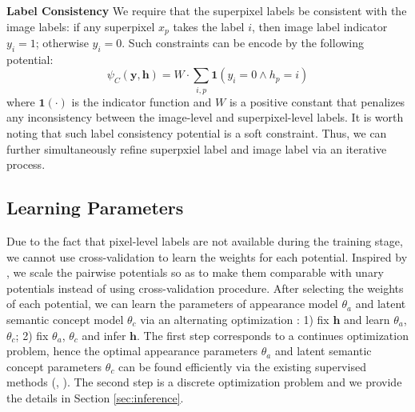 \textbf{Label Consistency}
We require that the superpixel labels be consistent with the image labels: if any superpixel $x_p$ takes the label $i$, then image label indicator $y_i=1$; otherwise $y_i=0$. Such constraints can be encode by the following potential:
\begin{equation}
    \psi_{C}(\boldsymbol{y},\boldsymbol{h}) =
    W \cdot \sum_{i,p} \mathbf{1}(y_i=0 \land h_p=i)
\end{equation}
where $\mathbf{1}(\cdot)$ is the indicator function and $W$ is a positive constant that penalizes any inconsistency between the image-level and superpixel-level labels. It is worth noting that such label consistency potential is a soft constraint. Thus, we can further simultaneously refine superpxiel label and image label via an iterative process.

\subsection{Learning Parameters}
\label{learningparameters}
Due to the fact that pixel-level labels are not available during the training stage, we cannot use cross-validation \cite{kohli2009robust} to learn the weights for each potential.
Inspired by \cite{vezhnevets2011weakly}, we scale the pairwise potentials so as to make them comparable with unary potentials instead of using cross-validation procedure.
After selecting the weights of each potential, we can learn the parameters of appearance model $\theta_a$ and latent semantic concept model $\theta_c$ via an alternating optimization \cite{vezhnevets2011weakly}: 1) fix $\boldsymbol{h}$ and learn $\theta_a$, $\theta_c$; 2) fix $\theta_a$, $\theta_c$ and infer $\boldsymbol{h}$.
The first step corresponds to a continues optimization problem, hence the optimal appearance parameters $\theta_a$ and latent semantic concept parameters $\theta_c$ can be found efficiently via the existing supervised methods (\eg, \cite{shotton2006textonboost}). The second step is a discrete optimization problem and we provide the details in Section \ref{sec:inference}.

